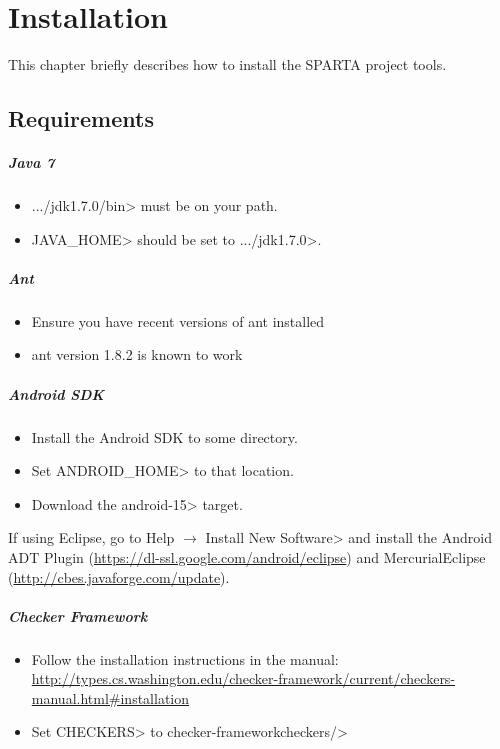\htmlhr
\chapter{Installation\label{installation}}

This chapter briefly describes how to install the SPARTA project tools.

\section {Requirements\label{sec:requirements}}
\paragraph{Java 7}
\begin{itemize}

 \item  \<.../jdk1.7.0/bin> must be on your path.
 \item \<JAVA\_HOME> should be set to \<.../jdk1.7.0>.
\end{itemize}

\paragraph{Ant}
\begin{itemize}
\item Ensure you have recent versions of ant  installed
 \item ant version 1.8.2 is known to work
\end{itemize}

\paragraph{Android SDK}
\begin{itemize}
 \item Install the Android SDK to some directory. 
 \item Set \<ANDROID\_HOME> to that location.
 \item Download the \<android-15> target.
\end{itemize}

If using Eclipse, go to
\<Help $\rightarrow$ Install New Software>
and install the Android ADT Plugin (\url{https://dl-ssl.google.com/android/eclipse}) and MercurialEclipse (\url{http://cbes.javaforge.com/update}).

\paragraph{Checker Framework}
\begin{itemize}
\item Follow the installation instructions in the manual: 
\url{http://types.cs.washington.edu/checker-framework/current/checkers-manual.html#installation}
\item Set \<CHECKERS> to \<checker-framework\/checkers/>
\end{itemize}


